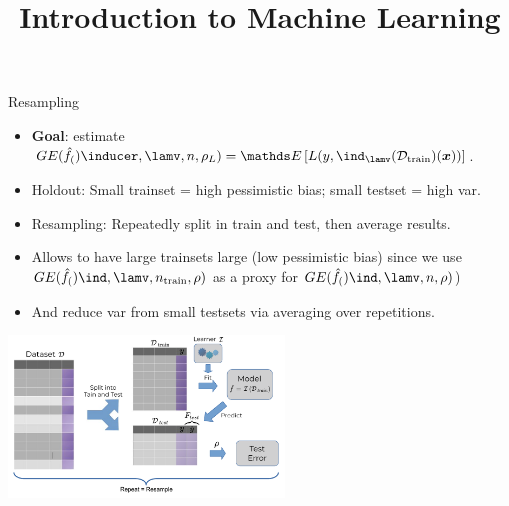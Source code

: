 





\newcommand{\titlefigure}{figure_man/crossvalidation}
\newcommand{\learninggoals}{
\item Understand how resampling techniques extend the idea of simple train-test splits
\item Understand the ideas of cross-validation, bootstrap and subsampling
}


\title{Introduction to Machine Learning}
\date{}



\sloppy


\begin{vbframe}{Resampling}

\begin{footnotesize}
\begin{itemize}
  \item \textbf{Goal}: estimate $\GE(\inducer, \lamv, n, \rho_L) = \E \left[L(y, \Ilam(\Dtrain)(\xv)) \right]$.
  \item Holdout: 
      Small trainset = high pessimistic bias; small testset = high var.
   \item Resampling: Repeatedly split in train and test, then average results.
  \item Allows to have large trainsets large (low pessimistic bias) since we use 
  $\GEfull$ as a proxy for $\GEfull[n]$)
\item And reduce var from small testsets via averaging over repetitions.
\end{itemize}
\end{footnotesize}

\begin{center}
\includegraphics[width=0.55\textwidth]{figure_man/resampling_error.pdf}
\end{center}

\end{vbframe}

